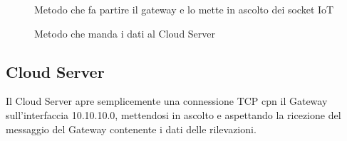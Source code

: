\documentclass[a4paper,12pt]{report}
\begin{document}
	\begin{figure}[!htb]
		\caption{Metodo che fa partire il gateway e lo mette in ascolto dei socket IoT}
	\end{figure}

	\begin{figure}[!htb]
		\caption{Metodo che manda i dati al Cloud Server}
	\end{figure}	
	
	
	\subsection{Cloud Server}
	Il Cloud Server apre semplicemente una connessione TCP cpn il Gateway sull'interfaccia 10.10.10.0, mettendosi in ascolto e aspettando la ricezione del messaggio del Gateway contenente i dati delle rilevazioni.
	
\end{document}
